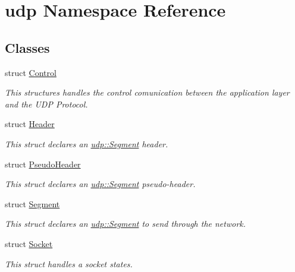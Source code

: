 \hypertarget{namespaceudp}{}\section{udp Namespace Reference}
\label{namespaceudp}
\subsection*{Classes}
\begin{DoxyCompactItemize}
\item 
struct \hyperlink{structudp_1_1Control}{Control}
\begin{DoxyCompactList}\small\item\em This structures handles the control comunication between the application layer and the U\+DP Protocol. \end{DoxyCompactList}\item 
struct \hyperlink{structudp_1_1Header}{Header}
\begin{DoxyCompactList}\small\item\em This struct declares an \hyperlink{structudp_1_1Segment}{udp\+::\+Segment} header. \end{DoxyCompactList}\item 
struct \hyperlink{structudp_1_1PseudoHeader}{Pseudo\+Header}
\begin{DoxyCompactList}\small\item\em This struct declares an \hyperlink{structudp_1_1Segment}{udp\+::\+Segment} pseudo-\/header. \end{DoxyCompactList}\item 
struct \hyperlink{structudp_1_1Segment}{Segment}
\begin{DoxyCompactList}\small\item\em This struct declares an \hyperlink{structudp_1_1Segment}{udp\+::\+Segment} to send through the network. \end{DoxyCompactList}\item 
struct \hyperlink{structudp_1_1Socket}{Socket}
\begin{DoxyCompactList}\small\item\em This struct handles a socket states. \end{DoxyCompactList}\end{DoxyCompactItemize}
